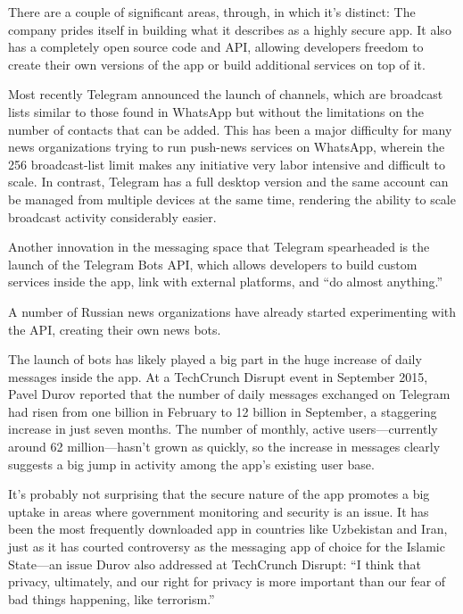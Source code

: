 \documentclass[notoc, symmetric, nobib, nols]{towcenter-guideto-book}
\begin{document}
There are a couple of significant areas, through, in which it's distinct: The company prides itself in building what it describes as a highly secure app. It also has a completely open source code and API, allowing developers freedom to create their own versions of the app or build additional services on top of it.

Most recently Telegram announced the launch of channels,\autocite{TelegramChannels} which are broadcast lists similar to those found in WhatsApp but without the limitations on the number of contacts that can be added. This has been a major difficulty for many news organizations trying to run push-news services on WhatsApp, wherein the 256 broadcast-list limit makes any initiative very labor intensive and difficult to scale. In contrast, Telegram has a full desktop version and the same account can be managed from multiple devices at the same time, rendering the ability to scale broadcast activity considerably easier.

Another innovation in the messaging space that Telegram spearheaded is the launch of the Telegram Bots API,\autocite{TelegramBots} which allows developers to build custom services inside the app, link with external platforms, and ``do almost anything.'' 

A number of Russian news organizations have already started experimenting with the API, creating their own news bots.

The launch of bots has likely played a big part in the huge increase of daily messages inside the app. At a TechCrunch Disrupt event in September 2015,\autocite{TechCrunch} Pavel Durov reported that the number of daily messages exchanged on Telegram had risen from one billion in February to 12 billion in September, a staggering increase in just seven months. The number of monthly, active users---currently around 62 million---hasn't grown as quickly, so the increase in messages clearly suggests a big jump in activity among the app's existing user base. 

It's probably not surprising that the secure nature of the app promotes a big uptake in areas where government monitoring and security is an issue. It has been the most frequently downloaded app in countries like Uzbekistan and Iran, just as it has courted controversy as the messaging app of choice for the Islamic State---an issue Durov also addressed at TechCrunch Disrupt: ``I think that privacy, ultimately, and our right for privacy is more important than our fear of bad things happening, like terrorism.''
\end{document}
